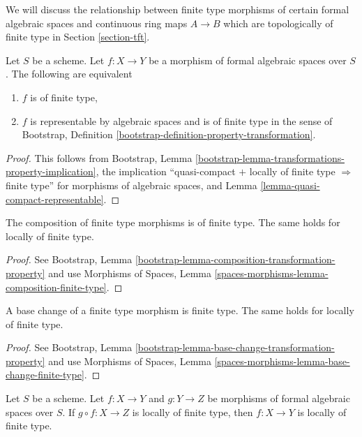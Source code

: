 \noindent
We will discuss the relationship between finite type morphisms of
certain formal algebraic spaces and
continuous ring maps $A \to B$ which are topologically of finite type
in Section \ref{section-tft}.

\begin{lemma}
\label{lemma-characterize-finite-type}
Let $S$ be a scheme. Let $f : X \to Y$ be a morphism of formal algebraic
spaces over $S$. The following are equivalent
\begin{enumerate}
\item $f$ is of finite type,
\item $f$ is representable by algebraic spaces and is of finite type in
the sense of
Bootstrap, Definition \ref{bootstrap-definition-property-transformation}.
\end{enumerate}
\end{lemma}

\begin{proof}
This follows from Bootstrap, Lemma
\ref{bootstrap-lemma-transformations-property-implication},
the implication ``quasi-compact $+$ locally of finite type
$\Rightarrow$ finite type'' for morphisms of algebraic spaces, and
Lemma \ref{lemma-quasi-compact-representable}.
\end{proof}

\begin{lemma}
\label{lemma-composition-finite-type}
The composition of finite type morphisms is of finite type.
The same holds for locally of finite type.
\end{lemma}

\begin{proof}
See Bootstrap, Lemma \ref{bootstrap-lemma-composition-transformation-property}
and use Morphisms of Spaces, Lemma
\ref{spaces-morphisms-lemma-composition-finite-type}.
\end{proof}

\begin{lemma}
\label{lemma-base-change-finite-type}
A base change of a finite type morphism is finite type.
The same holds for locally of finite type.
\end{lemma}

\begin{proof}
See Bootstrap, Lemma \ref{bootstrap-lemma-base-change-transformation-property}
and use Morphisms of Spaces, Lemma
\ref{spaces-morphisms-lemma-base-change-finite-type}.
\end{proof}

\begin{lemma}
\label{lemma-permanence-finite-type}
Let $S$ be a scheme. Let $f : X \to Y$ and $g : Y \to Z$ be morphisms of
formal algebraic spaces over $S$. If $g \circ f : X \to Z$ is locally of
finite type, then $f : X \to Y$ is locally of finite type.
\end{lemma}

